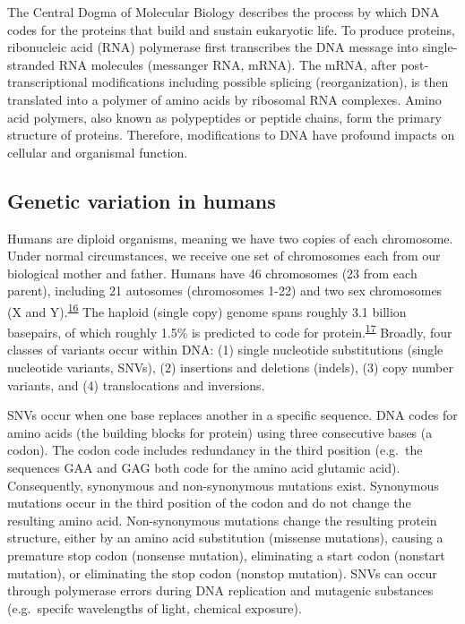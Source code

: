 \documentclass[11pt,letterpaper]{book}
\begin{document}
The Central Dogma of Molecular Biology describes the process by which DNA codes for the proteins that build and sustain eukaryotic life.
To produce proteins, ribonucleic acid (RNA) polymerase first transcribes the DNA message into single-stranded RNA molecules (messanger RNA, mRNA).
The mRNA, after post-transcriptional modifications including possible splicing (reorganization), is then translated into a polymer of amino acids by ribosomal RNA complexes.
Amino acid polymers, also known as polypeptides or peptide chains, form the primary structure of proteins.
Therefore, modifications to DNA have profound impacts on cellular and organismal function.

\hypertarget{genVar}{%
\subsection{Genetic variation in humans}\label{genVar}}

Humans are diploid organisms, meaning we have two copies of each chromosome.
Under normal circumstances, we receive one set of chromosomes each from our biological mother and father.
Humans have 46 chromosomes (23 from each parent), including 21 autosomes (chromosomes 1-22) and two sex chromosomes (X and Y).\textsuperscript{\protect\hyperlink{ref-tjio:1956aa}{16}}
The haploid (single copy) genome spans roughly 3.1 billion basepairs, of which roughly 1.5\% is predicted to code for protein.\textsuperscript{\protect\hyperlink{ref-lander:2001aa}{17}}
Broadly, four classes of variants occur within DNA: (1) single nucleotide substitutions (single nucleotide variants, SNVs), (2) insertions and deletions (indels), (3) copy number variants, and (4) translocations and inversions.

SNVs occur when one base replaces another in a specific sequence.
DNA codes for amino acids (the building blocks for protein) using three consecutive bases (a codon).
The codon code includes redundancy in the third position (e.g.~the sequences GAA and GAG both code for the amino acid glutamic acid).
Consequently, synonymous and non-synonymous mutations exist.
Synonymous mutations occur in the third position of the codon and do not change the resulting amino acid.
Non-synonymous mutations change the resulting protein structure, either by an amino acid substitution (missense mutations), causing a premature stop codon (nonsense mutation), eliminating a start codon (nonstart mutation), or eliminating the stop codon (nonstop mutation).
SNVs can occur through polymerase errors during DNA replication and mutagenic substances (e.g.~specifc wavelengths of light, chemical exposure).
\end{document}
